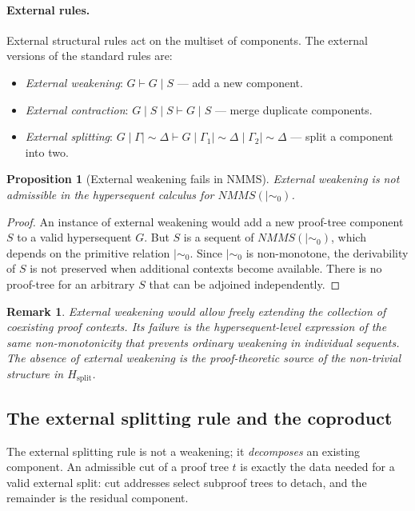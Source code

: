 \documentclass[11pt]{article}
\newtheorem{proposition}[theorem]{Proposition}
\newtheorem{remark}[theorem]{Remark}
\newcommand{\ms}{\mathrel{\mid\!\sim}}
\newcommand{\mszero}{\mathrel{\mid\!\sim_{0}}}
\newcommand{\NMMS}{\mathit{NMMS}}
\begin{document}
\paragraph{External rules.}  External structural rules act on the multiset of components.  The external versions of the standard rules are:
\begin{itemize}
\item \emph{External weakening}: $G \vdash G \mid S$ --- add a new component.
\item \emph{External contraction}: $G \mid S \mid S \vdash G \mid S$ --- merge duplicate components.
\item \emph{External splitting}: $G \mid \Gamma\ms\Delta \vdash G \mid \Gamma_1\ms\Delta \mid \Gamma_2\ms\Delta$ --- split a component into two.
\end{itemize}

\begin{proposition}[External weakening fails in NMMS]
External weakening is not admissible in the hypersequent calculus for $\NMMS(\mszero)$.
\end{proposition}
\begin{proof}
An instance of external weakening would add a new proof-tree component $S$ to a valid hypersequent $G$.  But $S$ is a sequent of $\NMMS(\mszero)$, which depends on the primitive relation $\mszero$.  Since $\mszero$ is non-monotone, the derivability of $S$ is not preserved when additional contexts become available.  There is no proof-tree for an arbitrary $S$ that can be adjoined independently.
\end{proof}

\begin{remark}
External weakening would allow freely extending the collection of coexisting proof contexts.  Its failure is the hypersequent-level expression of the same non-monotonicity that prevents ordinary weakening in individual sequents.  The absence of external weakening is the proof-theoretic source of the non-trivial structure in $H_{\mathrm{split}}$.
\end{remark}

\subsection{The external splitting rule and the coproduct}

The external splitting rule is not a weakening; it \emph{decomposes} an existing component.  An admissible cut of a proof tree $t$ is exactly the data needed for a valid external split: cut addresses select subproof trees to detach, and the remainder is the residual component.
\end{document}

